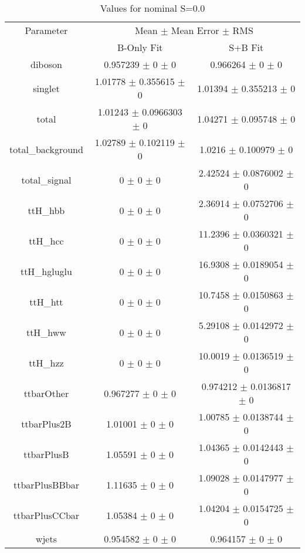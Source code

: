\begin{table}
\centering
\caption{Values for nominal S=0.0}
\begin{tabular}{ccc}
\toprule
Parameter & \multicolumn{2}{c}{Mean $\pm$ Mean Error $\pm$ RMS}\\
 & B-Only Fit & S+B Fit\\
\midrule
diboson & \num{0.957239} $\pm$ \num{0} $\pm$ \num{0} & \num{0.966264} $\pm$ \num{0} $\pm$ \num{0}\\
singlet & \num{1.01778} $\pm$ \num{0.355615} $\pm$ \num{0} & \num{1.01394} $\pm$ \num{0.355213} $\pm$ \num{0}\\
total & \num{1.01243} $\pm$ \num{0.0966303} $\pm$ \num{0} & \num{1.04271} $\pm$ \num{0.095748} $\pm$ \num{0}\\
total\_background & \num{1.02789} $\pm$ \num{0.102119} $\pm$ \num{0} & \num{1.0216} $\pm$ \num{0.100979} $\pm$ \num{0}\\
total\_signal & \num{0} $\pm$ \num{0} $\pm$ \num{0} & \num{2.42524} $\pm$ \num{0.0876002} $\pm$ \num{0}\\
ttH\_hbb & \num{0} $\pm$ \num{0} $\pm$ \num{0} & \num{2.36914} $\pm$ \num{0.0752706} $\pm$ \num{0}\\
ttH\_hcc & \num{0} $\pm$ \num{0} $\pm$ \num{0} & \num{11.2396} $\pm$ \num{0.0360321} $\pm$ \num{0}\\
ttH\_hgluglu & \num{0} $\pm$ \num{0} $\pm$ \num{0} & \num{16.9308} $\pm$ \num{0.0189054} $\pm$ \num{0}\\
ttH\_htt & \num{0} $\pm$ \num{0} $\pm$ \num{0} & \num{10.7458} $\pm$ \num{0.0150863} $\pm$ \num{0}\\
ttH\_hww & \num{0} $\pm$ \num{0} $\pm$ \num{0} & \num{5.29108} $\pm$ \num{0.0142972} $\pm$ \num{0}\\
ttH\_hzz & \num{0} $\pm$ \num{0} $\pm$ \num{0} & \num{10.0019} $\pm$ \num{0.0136519} $\pm$ \num{0}\\
ttbarOther & \num{0.967277} $\pm$ \num{0} $\pm$ \num{0} & \num{0.974212} $\pm$ \num{0.0136817} $\pm$ \num{0}\\
ttbarPlus2B & \num{1.01001} $\pm$ \num{0} $\pm$ \num{0} & \num{1.00785} $\pm$ \num{0.0138744} $\pm$ \num{0}\\
ttbarPlusB & \num{1.05591} $\pm$ \num{0} $\pm$ \num{0} & \num{1.04365} $\pm$ \num{0.0142443} $\pm$ \num{0}\\
ttbarPlusBBbar & \num{1.11635} $\pm$ \num{0} $\pm$ \num{0} & \num{1.09028} $\pm$ \num{0.0147977} $\pm$ \num{0}\\
ttbarPlusCCbar & \num{1.05384} $\pm$ \num{0} $\pm$ \num{0} & \num{1.04204} $\pm$ \num{0.0154725} $\pm$ \num{0}\\
wjets & \num{0.954582} $\pm$ \num{0} $\pm$ \num{0} & \num{0.964157} $\pm$ \num{0} $\pm$ \num{0}\\
\bottomrule
\end{tabular}
\end{table}